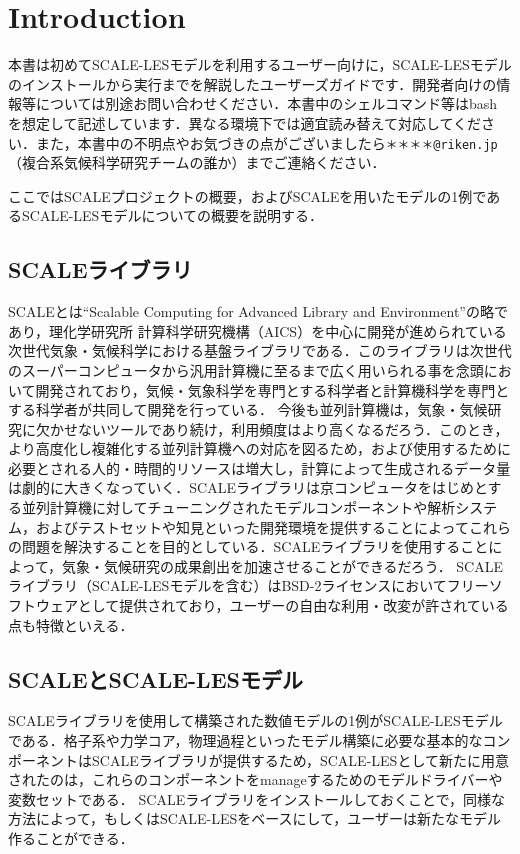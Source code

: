 \section{Introduction}

本書は初めてSCALE-LESモデルを利用するユーザー向けに，SCALE-LESモデルのインストールから実行までを解説したユーザーズガイドです．開発者向けの情報等については別途お問い合わせください．本書中のシェルコマンド等はbash を想定して記述しています．異なる環境下では適宜読み替えて対応してください．また，本書中の不明点やお気づきの点がございましたら\verb|＊＊＊＊@riken.jp|（複合系気候科学研究チームの誰か）までご連絡ください．

ここではSCALEプロジェクトの概要，およびSCALEを用いたモデルの1例であるSCALE-LESモデルについての概要を説明する．

\subsection{SCALEライブラリ}
SCALEとは“Scalable Computing for Advanced Library and Environment”の略であり，理化学研究所 計算科学研究機構（AICS）を中心に開発が進められている次世代気象・気候科学における基盤ライブラリである．このライブラリは次世代のスーパーコンピュータから汎用計算機に至るまで広く用いられる事を念頭において開発されており，気候・気象科学を専門とする科学者と計算機科学を専門とする科学者が共同して開発を行っている．
今後も並列計算機は，気象・気候研究に欠かせないツールであり続け，利用頻度はより高くなるだろう．このとき，より高度化し複雑化する並列計算機への対応を図るため，および使用するために必要とされる人的・時間的リソースは増大し，計算によって生成されるデータ量は劇的に大きくなっていく．SCALEライブラリは京コンピュータをはじめとする並列計算機に対してチューニングされたモデルコンポーネントや解析システム，およびテストセットや知見といった開発環境を提供することによってこれらの問題を解決することを目的としている．SCALEライブラリを使用することによって，気象・気候研究の成果創出を加速させることができるだろう．
SCALEライブラリ（SCALE-LESモデルを含む）はBSD-2ライセンスにおいてフリーソフトウェアとして提供されており，ユーザーの自由な利用・改変が許されている点も特徴といえる．


\subsection{SCALEとSCALE-LESモデル}
SCALEライブラリを使用して構築された数値モデルの1例がSCALE-LESモデルである．格子系や力学コア，物理過程といったモデル構築に必要な基本的なコンポーネントはSCALEライブラリが提供するため，SCALE-LESとして新たに用意されたのは，これらのコンポーネントをmanageするためのモデルドライバーや変数セットである．
SCALEライブラリをインストールしておくことで，同様な方法によって，もしくはSCALE-LESをベースにして，ユーザーは新たなモデル作ることができる．


